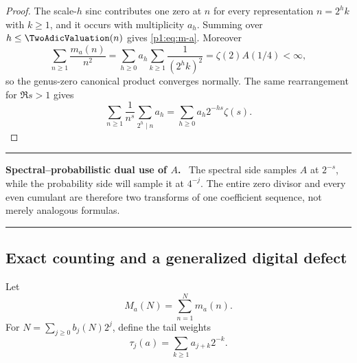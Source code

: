 \documentclass[11pt,oneside]{article}
\numberwithin{equation}{section}
\theoremstyle{definition}
\theoremstyle{remark}
\newenvironment{resultbox}[1]{%
  \par\medskip\noindent\begin{center}\begin{minipage}{0.94\textwidth}%
  \color{deepgreen}\hrule\vspace{0.65em}%
  \color{black}\textbf{\color{deepgreen}#1.}\ }{%
  \par\vspace{0.65em}\color{deepgreen}\hrule
  \end{minipage}\end{center}\medskip}
\begin{document}
\begin{proof}
The scale-$h$ sinc contributes one zero at $n$ for every representation $n=2^hk$ with
$k\ge1$, and it occurs with multiplicity $a_h$.  Summing over $h\le\TwoAdicValuation(n)$ gives
\eqref{p1:eq:m-a}.  Moreover
\[
 \sum_{n\ge1}\frac{m_a(n)}{n^2}
 =\sum_{h\ge0}a_h\sum_{k\ge1}\frac1{(2^hk)^2}
 =\zeta(2)A(1/4)<\infty,
\]
so the genus-zero canonical product converges normally.  The same rearrangement for
$\Re s>1$ gives
\[
 \sum_{n\ge1}\frac1{n^s}\sum_{2^h\mid n}a_h
 =\sum_{h\ge0}a_h2^{-hs}\zeta(s).
\]
\end{proof}

\begin{resultbox}{Spectral--probabilistic dual use of $A$}
The spectral side samples $A$ at $2^{-s}$, while the probability side will sample it at
$4^{-j}$.  The entire zero divisor and every even cumulant are therefore two transforms of
one coefficient sequence, not merely analogous formulas.
\end{resultbox}

\subsection{Exact counting and a generalized digital defect}

Let
\begin{equation}
 M_a(N)=\sum_{n=1}^{N}m_a(n).
 \label{p1:eq:M-a}
\end{equation}
For $N=\sum_{j\ge0}b_j(N)2^j$, define the tail weights
\begin{equation}
 \tau_j(a)=\sum_{k\ge1}a_{j+k}2^{-k}.
 \label{p1:eq:tau-j}
\end{equation}
\end{document}
